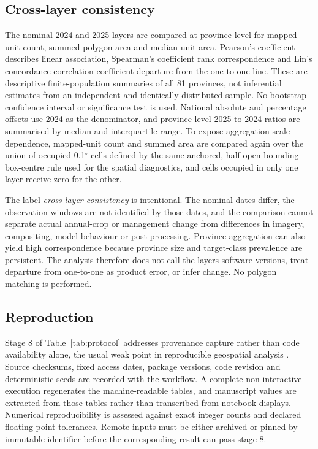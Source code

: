 \documentclass[pdflatex,sn-basic]{sn-jnl}
\begin{document}
\subsection{Cross-layer consistency}\label{subsec:agreement-methods}

The nominal 2024 and 2025 layers are compared at province level for mapped-unit count, summed polygon area and median unit area. Pearson's coefficient describes linear association, Spearman's coefficient rank correspondence and Lin's concordance correlation coefficient departure from the one-to-one line. These are descriptive finite-population summaries of all 81 provinces, not inferential estimates from an independent and identically distributed sample. No bootstrap confidence interval or significance test is used. National absolute and percentage offsets use 2024 as the denominator, and province-level 2025-to-2024 ratios are summarised by median and interquartile range. To expose aggregation-scale dependence, mapped-unit count and summed area are compared again over the union of occupied 0.1$^{\circ}$ cells defined by the same anchored, half-open bounding-box-centre rule used for the spatial diagnostics, and cells occupied in only one layer receive zero for the other.

The label \emph{cross-layer consistency} is intentional. The nominal dates differ, the observation windows are not identified by those dates, and the comparison cannot separate actual annual-crop or management change from differences in imagery, compositing, model behaviour or post-processing. Province aggregation can also yield high correspondence because province size and target-class prevalence are persistent. The analysis therefore does not call the layers software versions, treat departure from one-to-one as product error, or infer change. No polygon matching is performed.

\subsection{Reproduction}\label{subsec:reproducibility}

Stage 8 of Table~\ref{tab:protocol} addresses provenance capture rather than code availability alone, the usual weak point in reproducible geospatial analysis \citep{tullis_where_2020}. Source checksums, fixed access dates, package versions, code revision and deterministic seeds are recorded with the workflow. A complete non-interactive execution regenerates the machine-readable tables, and manuscript values are extracted from those tables rather than transcribed from notebook displays. Numerical reproducibility is assessed against exact integer counts and declared floating-point tolerances. Remote inputs must be either archived or pinned by immutable identifier before the corresponding result can pass stage 8.
\end{document}
